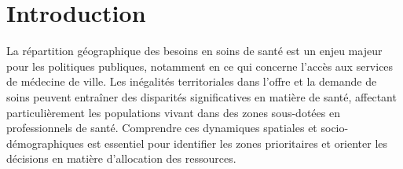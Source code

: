 \documentclass[
]{article}
\author{}
\date{\vspace{-2.5em}}
\begin{document}
\setcounter{tocdepth}{5}                
\renewcommand\contentsname{\begin{center}\textcolor{brown}{Sommaire}\end{center}}
\AtBeginShipout{
  \ifnum\value{page}=1\thispagestyle{empty}\fi}
\pagestyle{fancy}
\fancyhf{}
\renewcommand{\headrulewidth}{0.4pt}
\renewcommand{\footrulewidth}{0.4pt}
\fancyhead[R]{\textcolor{brown}{@Alex, Ali, Richard \& Toussaint}}
\fancyfoot[C]{\thepage}

\tableofcontents

\newpage

\renewcommand\listtablename{\begin{center}\textcolor{brown}{Liste des Tableaux}\end{center}}
\renewcommand\listfigurename{\begin{center}\textcolor{brown}{Liste des Figures}\end{center}}

\setlength{\cftfignumwidth}{3em}
\setlength{\cfttabnumwidth}{3em}

\listoftables

\newpage

\listoffigures

\newpage

\hypertarget{introduction}{%
\section{Introduction}\label{introduction}}

La répartition géographique des besoins en soins de santé est un enjeu
majeur pour les politiques publiques, notamment en ce qui concerne
l'accès aux services de médecine de ville. Les inégalités territoriales
dans l'offre et la demande de soins peuvent entraîner des disparités
significatives en matière de santé, affectant particulièrement les
populations vivant dans des zones sous-dotées en professionnels de
santé. Comprendre ces dynamiques spatiales et socio-démographiques est
essentiel pour identifier les zones prioritaires et orienter les
décisions en matière d'allocation des ressources.
\end{document}
